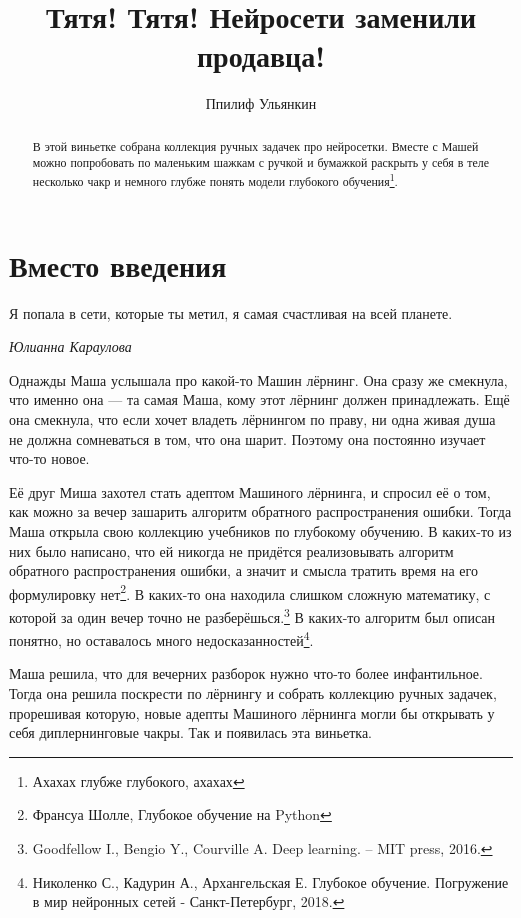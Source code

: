 \documentclass[12pt, a4paper, oneside]{article}
\title{Тятя! Тятя! Нейросети заменили продавца!}
\date{ }
\author{Ппилиф Ульянкин}
\begin{document}
\toggletrue{lecture}

\maketitle

	
\begin{abstract}
    В этой виньетке собрана коллекция ручных задачек про нейросетки. Вместе с Машей можно попробовать по маленьким шажкам с ручкой и бумажкой раскрыть у себя в теле несколько чакр и немного глубже понять модели глубокого обучения\footnote{Ахахах глубже глубокого, ахахах}.
\end{abstract}

\section*{Вместо введения}

\epigraph{Я попала в сети, которые ты метил, я самая счастливая на всей планете.}{\textit{Юлианна Караулова}}

    Однажды Маша услышала про какой-то Машин лёрнинг. Она сразу же смекнула, что именно она --- та самая Маша, кому этот лёрнинг должен принадлежать. Ещё она смекнула, что если хочет владеть лёрнингом по праву, ни одна живая душа не должна сомневаться в том, что она шарит. Поэтому она постоянно изучает что-то новое. 
    
    Её друг Миша захотел стать адептом Машиного лёрнинга, и спросил её о том, как можно за вечер зашарить алгоритм обратного распространения ошибки. Тогда Маша открыла свою коллекцию учебников по глубокому обучению. В каких-то из них было написано, что ей никогда не придётся реализовывать алгоритм обратного распространения ошибки, а значит и смысла тратить время на его формулировку нет\footnote{Франсуа Шолле, Глубокое обучение на Python}. В каких-то она находила слишком сложную математику, с которой за один вечер точно не разберёшься.\footnote{Goodfellow I., Bengio Y., Courville A. Deep learning. – MIT press, 2016.} В каких-то алгоритм был описан понятно, но оставалось много недосказанностей\footnote{Николенко С., Кадурин А., Архангельская Е. Глубокое обучение. Погружение в мир нейронных сетей - Санкт-Петербург, 2018.}. 
    
    Маша решила, что для вечерних разборок нужно что-то более инфантильное. Тогда она решила поскрести по лёрнингу и собрать коллекцию ручных задачек, прорешивая которую, новые адепты Машиного лёрнинга могли бы открывать у себя диплернинговые чакры. Так и появилась эта виньетка.  
	
\end{document}
